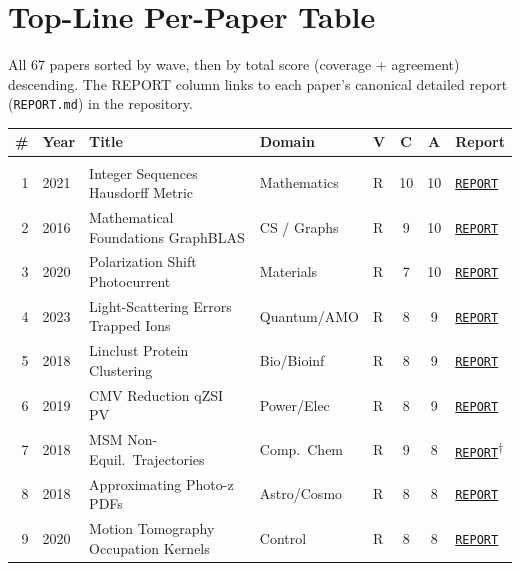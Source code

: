 \clearpage
\section{Top-Line Per-Paper Table}\label{sec:topline}

All 67 papers sorted by wave, then by total score (coverage + agreement)
descending. The REPORT column links to each paper's canonical detailed
report (\texttt{REPORT.md}) in the repository.

\newcommand{\rpt}[1]{\href{#1}{\texttt{REPORT}}}
\newcommand{\norpt}{\textit{(none)}}

{\small
\begin{longtable}{rlp{4.0cm}p{2.3cm}lccp{3.2cm}}
\toprule
\# & Year & Title & Domain & V & C & A & Report \\\midrule
\endhead
\bottomrule
\endfoot
\multicolumn{8}{l}{\textbf{Wave 1} (30 papers, 2026-04 early)} \\[3pt]
1 & 2021 & Integer Sequences Hausdorff Metric & Mathematics & R & 10 & 10 & \rpt{1997354-Integer-Sequences-from-Configurations-in-the/REPORT.md} \\
2 & 2016 & Mathematical Foundations GraphBLAS & CS / Graphs & R & 9 & 10 & \rpt{1379592-Mathematical-Foundations-of-the-GraphBLAS/REPORT.md} \\
3 & 2020 & Polarization Shift Photocurrent & Materials & R & 7 & 10 & \rpt{1523841-Quantitative-relationship-between-polarization-differences-a/REPORT.md} \\
4 & 2023 & Light-Scattering Errors Trapped Ions & Quantum/AMO & R & 8 & 9 & \rpt{2441075-Exactly-solved-model-of-light-scattering-errors-in/REPORT.md} \\
5 & 2018 & Linclust Protein Clustering & Bio/Bioinf & R & 8 & 9 & \rpt{1624105-Clustering-huge-protein-sequence-sets-in/REPORT.md} \\
6 & 2019 & CMV Reduction qZSI PV & Power/Elec & R & 8 & 9 & \rpt{1606674-Common-Mode-Voltage-Reduction-of-Single-Phase/REPORT.md} \\
7 & 2018 & MSM Non-Equil.\ Trajectories & Comp.\ Chem & R & 9 & 8 & \rpt{1565592-Markov-state-models-from-short-non-equilibrium/replication/replication\_report.md}\textsuperscript{$\dagger$} \\
8 & 2018 & Approximating Photo-z PDFs & Astro/Cosmo & R & 8 & 8 & \rpt{1461824-APPROXIMATING-PHOTO-Z-PDFS-FOR-LARGE-SURVEYS/REPORT.md} \\
9 & 2020 & Motion Tomography Occupation Kernels & Control & R & 8 & 8 & \rpt{1842593-MOTION-TOMOGRAPHY-VIA-OCCUPATION-KERNELS/REPORT.md} \\

\end{longtable}}
